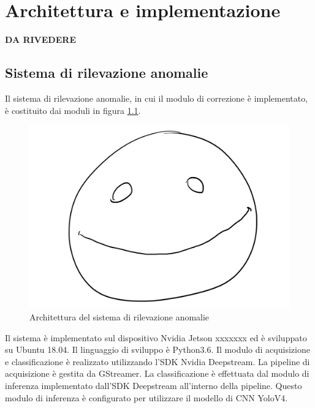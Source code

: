 \chapter{Architettura e implementazione}
\label{sec:implementazione}

\textbf{DA RIVEDERE}


\section{Sistema di rilevazione anomalie}
Il sistema di rilevazione anomalie, in cui il modulo di correzione è implementato, è costituito dai moduli in figura \ref{fig:sys modules}.
\begin{figure}
    \caption{Architettura del sistema di rilevazione anomalie}
    \label{fig:sys modules}
    \centering
    \includegraphics[width=.66\textwidth]{images/placeholder.png}
\end{figure}
Il sistema è implementato sul dispositivo Nvidia Jetson xxxxxxx ed è sviluppato su Ubuntu 18.04.
Il linguaggio di sviluppo è Python3.6.
Il modulo di acquisizione e classificazione è realizzato utilizzando l'SDK Nvidia Deepstream.
La pipeline di acquisizione è gestita da GStreamer.
La classificazione è effettuata dal modulo di inferenza implementato dall'SDK Deepstream all'interno della pipeline.
Questo modulo di inferenza è configurato per utilizzare il modello di CNN YoloV4.

